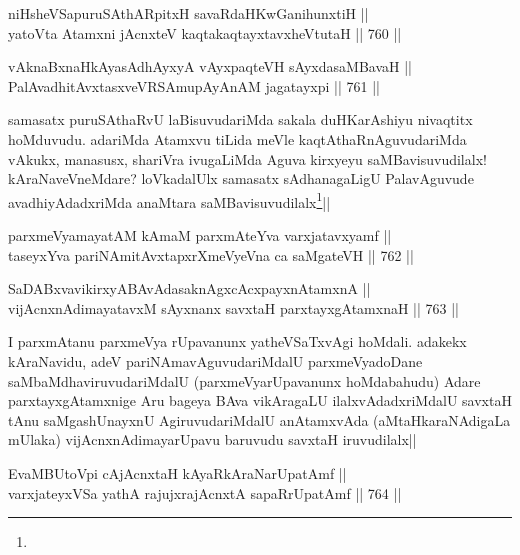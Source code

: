 
\begin{shl}
niHsheVSapuruSAthARpitxH savaRdaHKwGanihunxtiH || \\
yatoV\s ta Atamxni jAcnxteV kaqtakaqtayxtavxheVtutaH ||  760 ||  
\end{shl}
				
\begin{shl}
vAknaBxnaHkAyasAdhAyxyA vAyxpaqteVH sAyxdasaMBavaH || \\
PalAvadhitAvxtasxveVRSAmupAyAnAM jagatayxpi ||  761 ||  
\end{shl}

\begin{artha} 
samasatx puruSAthaRvU laBisuvudariMda sakala duHKarAshiyu nivaqtitx 
hoMduvudu. adariMda Atamxvu tiLida meVle kaqtAthaRnAguvudariMda 
vAkukx, manasusx, shariVra ivugaLiMda Aguva kirxyeyu 
saMBavisuvudilalx! kAraNaveVneMdare? loVkadalUlx samasatx 
sAdhanagaLigU PalavAguvude avadhiyAdadxriMda anaMtara 
saMBavisuvudilalx\footnote[1]{}||
\end{artha}


\begin{shl}
parxmeVyamayatAM kAmaM parxmAteYva varxjatavxyamf || \\
taseyxYva pariNAmitAvxtapxrXmeVyeVna ca saMgateVH ||  762 ||  
\end{shl}

\begin{shl}
SaDABxvavikirxyABAvAdasaknAgxcAcxpayxnAtamxnA || \\
vijAcnxnAdimayatavxM sAyxnanx savxtaH parxtayxgAtamxnaH ||  763 ||  
\end{shl}

\begin{artha} 
I parxmAtanu parxmeVya rUpavanunx yatheVSaTxvAgi hoMdali. adakekx 
kAraNavidu, adeV pariNAmavAguvudariMdalU parxmeVyadoDane 
saMbaMdhaviruvudariMdalU (parxmeVyarUpavanunx hoMdabahudu) Adare 
parxtayxgAtamxnige Aru bageya BAva vikAragaLU ilalxvAdadxriMdalU 
savxtaH tAnu saMgashUnayxnU AgiruvudariMdalU anAtamxvAda 
(aMtaHkaraNAdigaLa mUlaka) vijAcnxnAdimayarUpavu baruvudu savxtaH 
iruvudilalx||
\end{artha}

\begin{shl}
EvaMBUtoV\s pi cAjAcnxtaH kAyaRkAraNarUpatAmf || \\
varxjateyxVSa yathA rajujxrajAcnxtA sapaRrUpatAmf ||  764 ||  
\end{shl}

